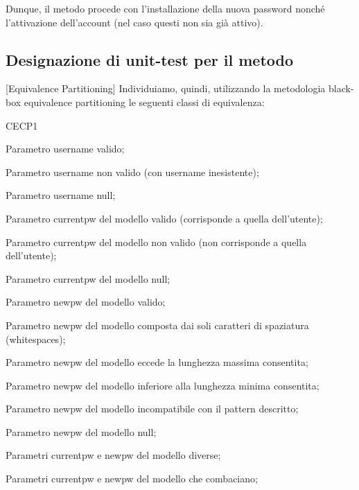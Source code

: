 Dunque, il metodo procede con l'installazione della nuova password nonché l'attivazione dell'account (nel caso questi non sia già attivo).

\newpage
\subsection{Designazione di unit-test per il metodo}[Equivalence Partitioning]
Individuiamo, quindi, utilizzando la metodologia black-box equivalence partitioning le seguenti classi di equivalenza:

\begin{eqpart}{CECP1}
	\item[CEU1]	Parametro username valido;
	\item[CEU2] Parametro username non valido (con username inesistente);
	\item[CEU3] Parametro username null;
	\item[CECP1] Parametro currentpw del modello  valido (corrisponde a quella dell'utente);
	\item[CECP2] Parametro currentpw del modello  non valido (non corrisponde a quella dell'utente);
	\item[CECP3] Parametro currentpw del modello  null;
	\item[CENP1] Parametro newpw del modello  valido;
	\item[CENP2] Parametro newpw del modello  composta dai soli caratteri di spaziatura (whitespaces);
	\item[CENP3] Parametro newpw del modello  eccede la lunghezza massima consentita;
	\item[CENP4] Parametro newpw del modello  inferiore alla lunghezza minima consentita;
	\item[CENP5] Parametro newpw del modello  incompatibile con il pattern descritto;
	\item[CENP6] Parametro newpw del modello  null;
	\item[CEX1]	Parametri currentpw e newpw del modello  diverse;
	\item[CEX2]	Parametri currentpw e newpw del modello  che combaciano;
\end{eqpart}

